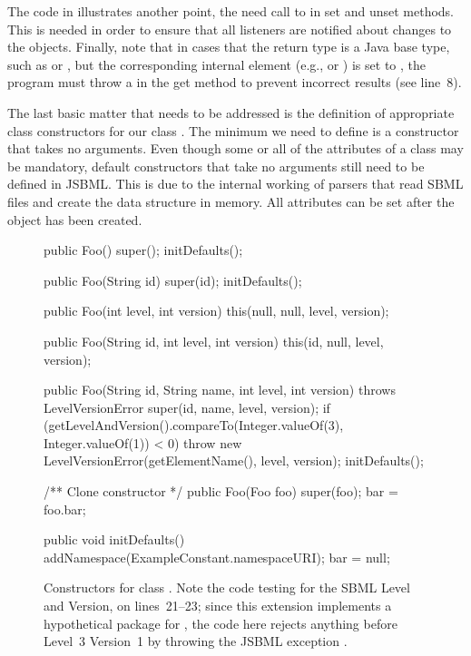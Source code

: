 The code in  illustrates
another point, the need call to  in set and
unset methods.  This is needed in order to ensure that all listeners are
notified about changes to the objects.  Finally, note that in cases that
the return type is a Java base type, such as  or ,
but the corresponding internal element (e.g.,  or
) is set to , the program must throw a
 in the get method to prevent incorrect
results (see line~8).

The last basic matter that needs to be addressed is the definition of
appropriate class constructors for our class .  The minimum we
need to define is a constructor that takes no arguments.  Even though some
or all of the attributes of a class may be mandatory, default constructors
that take no arguments still need to be defined in JSBML.  This is due to
the internal working of parsers that read SBML files and create the data
structure in memory.  All attributes can be set after the object has been
created.

\begin{figure}[b]
  \begin{example}[numbers=left]
public Foo() {
  super();
  initDefaults();
}

public Foo(String id) {
  super(id);
  initDefaults();
}

public Foo(int level, int version){
  this(null, null, level, version);
}

public Foo(String id, int level, int version) {
  this(id, null, level, version);
}

public Foo(String id, String name, int level, int version) throws LevelVersionError {
  super(id, name, level, version);
  if (getLevelAndVersion().compareTo(Integer.valueOf(3), Integer.valueOf(1)) < 0) {
    throw new LevelVersionError(getElementName(), level, version);
  }
  initDefaults();
}

/** Clone constructor */
public Foo(Foo foo) {
  super(foo);
  bar = foo.bar;
}

public void initDefaults() {
  addNamespace(ExampleConstant.namespaceURI);
  bar = null;
}\end{example}
  \caption{Constructors for class .  Note the code testing for
    the SBML Level and Version, on lines~21--23; since this extension
    implements a hypothetical package for \SBMLthree, the code here rejects
    anything before Level~3 Version~1 by throwing the JSBML exception
    \LevelVersionError.}
  \label{lst:ModelExtFooConstructors}
\end{figure}

